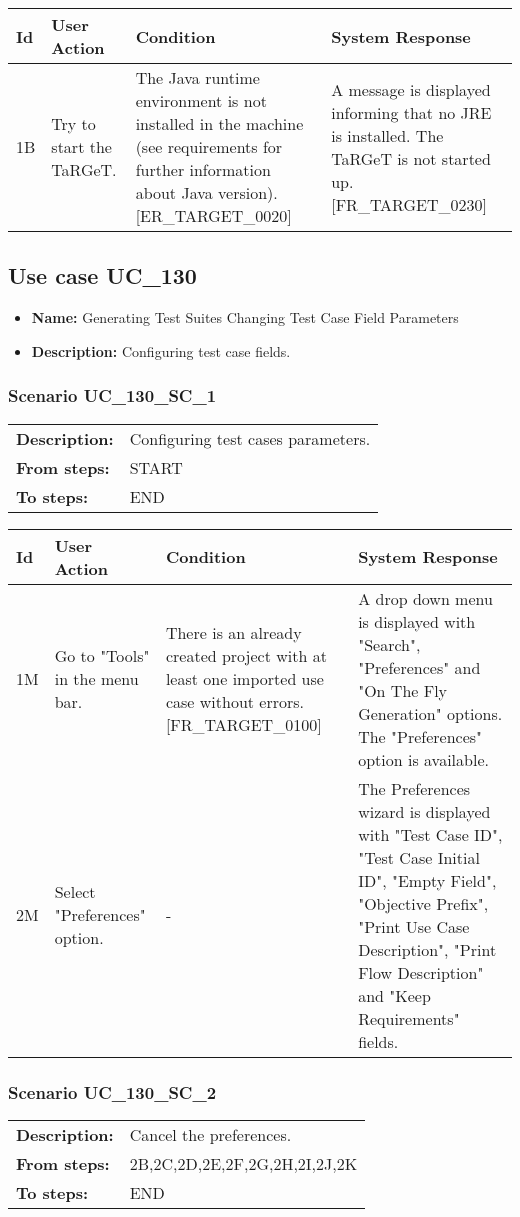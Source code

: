 \documentclass[a4paper,11pt]{article}
\newcommand{\bl}{\\ \hline}
\begin{document}
\begin{tabular}{|p{0.8in}|p{1.6in}|p{1.6in}|p{1.6in}|}
\hline
Id & User Action & Condition & System Response  \bl 
1B & Try to start the TaRGeT. & The Java runtime environment is not installed in the machine (see requirements for further information about Java version). [ER_TARGET_0020] & A message is displayed informing that no JRE is installed. The TaRGeT is not started up. [FR_TARGET_0230] \bl 
\end{tabular}
\subsection*{Use case UC_130}
\begin{itemize}
\item {\bf Name: }Generating Test Suites Changing Test Case Field Parameters
\item {\bf Description: }Configuring test case fields.
\end{itemize}
\subsubsection*{Scenario UC_130_SC_1}
\begin{tabular}{p{1in}p{4in}}
{\bf Description:} & Configuring test cases parameters. \\
{\bf From steps:} & START \\
{\bf To steps:} & END \\
\end{tabular}
 
\begin{tabular}{|p{0.8in}|p{1.6in}|p{1.6in}|p{1.6in}|}
\hline
Id & User Action & Condition & System Response  \bl 
1M & Go to "Tools" in the menu bar. & There is an already created project with at least one imported use case without errors. [FR_TARGET_0100] & A drop down menu is displayed with "Search", "Preferences" and "On The Fly Generation" options. The "Preferences" option is available. \bl 
2M & Select "Preferences" option. & - & The Preferences wizard is displayed with "Test Case ID", "Test Case Initial ID", "Empty Field", "Objective Prefix", "Print Use Case Description", "Print Flow Description" and "Keep Requirements" fields. \bl 
\end{tabular}
\subsubsection*{Scenario UC_130_SC_2}
\begin{tabular}{p{1in}p{4in}}
{\bf Description:} & Cancel the preferences. \\
{\bf From steps:} & 2B,2C,2D,2E,2F,2G,2H,2I,2J,2K \\
{\bf To steps:} & END \\
\end{tabular}
 
\end{document}
